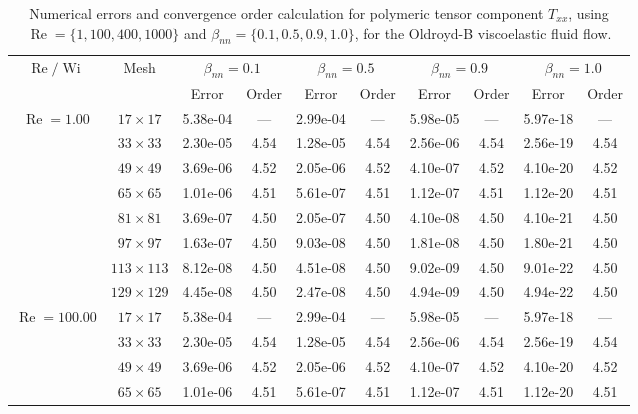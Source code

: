 \documentclass[preprint, 12pt]{elsarticle}
\begin{document}
{%
\begin{center}
\begin{table}[H]
\caption{Numerical errors and convergence order calculation for polymeric tensor component $T_{xx}$, using $\operatorname{Re}=\{1,100,400,1000\}$ and $\beta_{nn}=\{0.1,0.5,0.9,1.0\}$, for the Oldroyd-B viscoelastic fluid flow.\label{Appendix_tab_OldroydBTxxWi5_10}}
\tiny{
    \begin{tabular*}{\textwidth}{@{\extracolsep\fill}cccccccccc@{}}
    \hline
    \multirow{2}{*}{$\operatorname{Re}/\operatorname{Wi}$} & \multirow{2}{*}{Mesh} & \multicolumn{2}{c}{$\beta_{nn}=0.1$}  & \multicolumn{2}{c}{$\beta_{nn}=0.5$}  & \multicolumn{2}{c}{$\beta_{nn}=0.9$}  & \multicolumn{2}{c}{$\beta_{nn}=1.0$}\\ %
     & & Error & Order & Error & Order & Error & Order & Error & Order \\
    \hline
    \multirow{7}{*}{$\operatorname{Re}=1.00$} & $17\times 17$ & 5.38e-04 & --- & 2.99e-04 & --- & 5.98e-05 & --- & 5.97e-18 & --- \\
    & $33\times 33$ & 2.30e-05 & 4.54 & 1.28e-05 & 4.54 & 2.56e-06 & 4.54 & 2.56e-19 & 4.54 \\
    & $49\times 49$ & 3.69e-06 & 4.52 & 2.05e-06 & 4.52 & 4.10e-07 & 4.52 & 4.10e-20 & 4.52 \\
    \multirow{3}{*}{$\operatorname{Wi}=5$} & $65\times 65$ & 1.01e-06 & 4.51 & 5.61e-07 & 4.51 & 1.12e-07 & 4.51 & 1.12e-20 & 4.51 \\
    & $81\times 81$ & 3.69e-07 & 4.50 & 2.05e-07 & 4.50 & 4.10e-08 & 4.50 & 4.10e-21 & 4.50 \\
    & $97\times 97$ & 1.63e-07 & 4.50 & 9.03e-08 & 4.50 & 1.81e-08 & 4.50 & 1.80e-21 & 4.50 \\
    & $113\times 113$ & 8.12e-08 & 4.50 & 4.51e-08 & 4.50 & 9.02e-09 & 4.50 & 9.01e-22 & 4.50 \\
    & $129\times 129$ & 4.45e-08 & 4.50 & 2.47e-08 & 4.50 & 4.94e-09 & 4.50 & 4.94e-22 & 4.50 \\
    \hline
    \multirow{7}{*}{$\operatorname{Re}=100.00$} & $17\times 17$ & 5.38e-04 & --- & 2.99e-04 & --- & 5.98e-05 & --- & 5.97e-18 & --- \\
    & $33\times 33$ & 2.30e-05 & 4.54 & 1.28e-05 & 4.54 & 2.56e-06 & 4.54 & 2.56e-19 & 4.54 \\
    & $49\times 49$ & 3.69e-06 & 4.52 & 2.05e-06 & 4.52 & 4.10e-07 & 4.52 & 4.10e-20 & 4.52 \\
    \multirow{3}{*}{$\operatorname{Wi}=5$} & $65\times 65$ & 1.01e-06 & 4.51 & 5.61e-07 & 4.51 & 1.12e-07 & 4.51 & 1.12e-20 & 4.51 \\

\end{tabular*}}
\end{table}
\end{center}}
\end{document}
